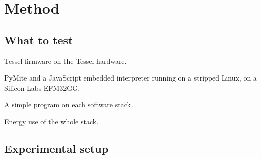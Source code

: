 \chapter{Method}

\section{What to test}
Tessel firmware on the Tessel hardware.

PyMite and a JavaScript embedded interpreter running on a stripped Linux, on a Silicon Labs EFM32GG.

A simple program on each software stack.

Energy use of the whole stack.



\section{Experimental setup}